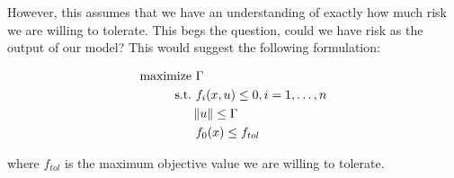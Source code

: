 However, this assumes that we have an understanding of exactly how much risk we are
willing to tolerate. This begs the question, could we have risk as the output of our
model? This would suggest the following formulation:

\begin{align*}
    \text{maximize} &~\Gamma \\
    \text{s.t.}     &~f_i(x,u) \leq 0, i = 1,\ldots,n \\
                    & \left\lVert u\right\rVert \leq \Gamma \\
                    &~f_0(x) \leq f_{tol}
    \label{eq:goalprogramming}
\end{align*}

where $f_{tol}$ is the maximum objective value we are willing to tolerate.

%

